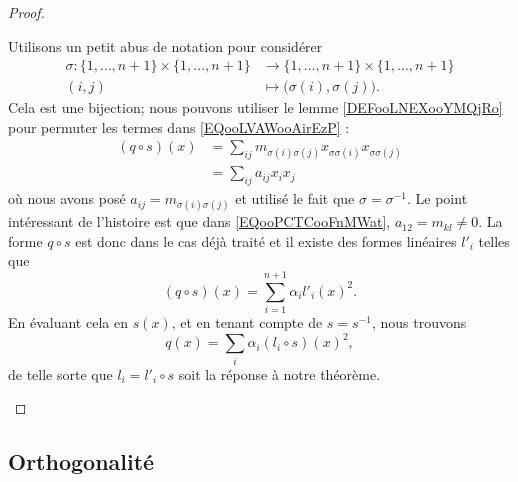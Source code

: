 \begin{proof}
\begin{subproof}
            Utilisons un petit abus de notation pour considérer
            \begin{equation}
                \begin{aligned}
                    \sigma\colon \{ 1,\ldots, n+1 \}\times \{ 1,\ldots, n+1 \}&\to \{ 1,\ldots, n+1 \}\times \{ 1,\ldots, n+1 \} \\
                    (i,j)&\mapsto \big(\sigma(i), \sigma(j)\big). 
                \end{aligned}
            \end{equation}
            Cela est une bijection; nous pouvons utiliser le lemme \ref{DEFooLNEXooYMQjRo} pour permuter les termes dans \eqref{EQooLVAWooAirEzP} :      
            \begin{subequations}
                \begin{align}
                    (q\circ s)(x)&=\sum_{ij}m_{\sigma(i)\sigma(j)}x_{\sigma\sigma(i)}x_{\sigma\sigma(j)}\\
                    &=\sum_{ij}a_{ij}x_ix_j     \label{EQooPCTCooFnMWat}
                \end{align}
            \end{subequations}
            où nous avons posé \( a_{ij}=m_{\sigma(i)\sigma(j)}\) et utilisé le fait que \( \sigma=\sigma^{-1}\). Le point intéressant de l'histoire est que dans \eqref{EQooPCTCooFnMWat}, \( a_{12}=m_{kl}\neq 0\). La forme \( q\circ s\) est donc dans le cas déjà traité et il existe des formes linéaires \( l'_i\) telles que
            \begin{equation}
                (q\circ s)(x)=\sum_{i=1}^{n+1}\alpha_il'_i(x)^2.
            \end{equation}
            En évaluant cela en \( s(x)\), et en tenant compte de \( s=s^{-1}\), nous trouvons
            \begin{equation}
                q(x)=\sum_i\alpha_i(l_i\circ s)(x)^2,
            \end{equation}
            de telle sorte que \( l_i=l'_i\circ s\) soit la réponse à notre théorème.
    \end{subproof}
\end{proof}

\subsection{Orthogonalité}

